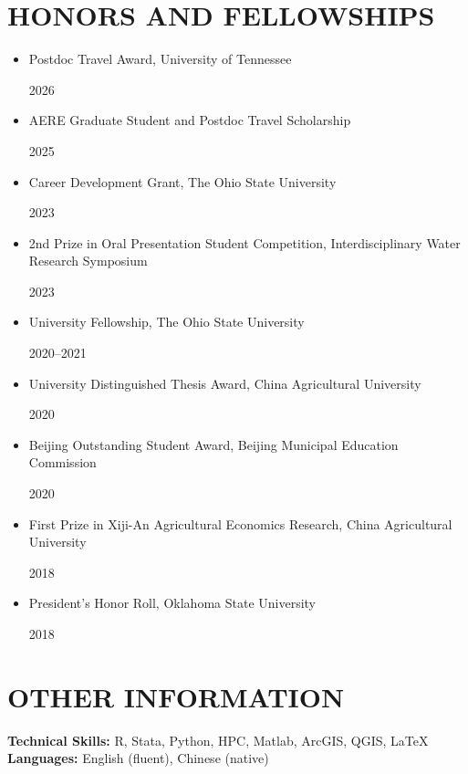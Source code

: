 \documentclass[letterpaper,10pt]{article}
\newcommand{\cvEntry}[2]{%
    \item \parbox[t]{\dimexpr\linewidth-6em\relax}{\raggedright #1}\hfill\mbox{#2}%
}
\begin{document}
\section{HONORS AND FELLOWSHIPS}
\begin{itemize}[leftmargin=1em, itemsep=2pt, parsep=0pt, topsep=2pt]
    \cvEntry{Postdoc Travel Award, University of Tennessee}{2026}
    \cvEntry{AERE Graduate Student and Postdoc Travel Scholarship}{2025}
    \cvEntry{Career Development Grant, The Ohio State University}{2023}
    \cvEntry{2nd Prize in Oral Presentation Student Competition, Interdisciplinary Water Research Symposium}{2023}
    \cvEntry{University Fellowship, The Ohio State University}{2020--2021}
    \cvEntry{University Distinguished Thesis Award, China Agricultural University}{2020}
    \cvEntry{Beijing Outstanding Student Award, Beijing Municipal Education Commission}{2020}
    \cvEntry{First Prize in Xiji-An Agricultural Economics Research, China Agricultural University}{2018}
    \cvEntry{President's Honor Roll, Oklahoma State University}{2018}
\end{itemize}

\section{OTHER INFORMATION}
\noindent\textbf{Technical Skills:} R, Stata, Python, HPC, Matlab, ArcGIS, QGIS, LaTeX\\
\textbf{Languages:} English (fluent), Chinese (native)
\end{document}
